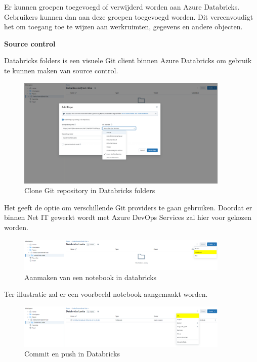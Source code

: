 Er kunnen groepen toegevoegd of verwijderd worden aan Azure Databricks. Gebruikers kunnen dan aan deze groepen toegevoegd worden. Dit vereenvoudigt het om toegang toe te wijzen aan werkruimten, gegevens en andere objecten.

\pagebreak

\textbf{Source control}

Databricks folders is een visuele Git client binnen Azure Databricks om gebruik te kunnen maken van source control.

\begin{figure}[H]
    \centering
    \includegraphics[width=0.9\textwidth]{./graphics/databricks/git_1.png}
    \caption{Clone Git repository in Databricks folders}
\end{figure}

Het geeft de optie om verschillende Git providers te gaan gebruiken. Doordat er binnen Net IT gewerkt wordt met Azure DevOps Services zal hier voor gekozen worden.

\begin{figure}[H]
    \includegraphics[width=0.9\textwidth]{./graphics/databricks/git_2.png}
    \caption{Aanmaken van een notebook in databricks}
\end{figure}

Ter illustratie zal er een voorbeeld notebook aangemaakt worden.

\begin{figure}[H]
    \centering
    \includegraphics[width=0.9\textwidth]{./graphics/databricks/git_3.png}
    \caption{Commit en push in Databricks}
\end{figure}

